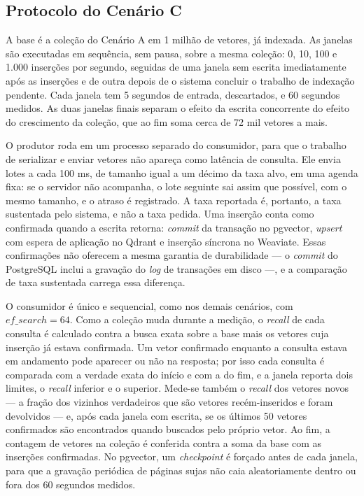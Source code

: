 \subsection{Protocolo do Cenário C}
\label{sec:protocolo_c}

A base é a coleção do Cenário A em 1 milhão de vetores, já indexada. As janelas são executadas em sequência, sem pausa, sobre a mesma coleção: 0, 10, 100 e 1.000 inserções por segundo, seguidas de uma janela sem escrita imediatamente após as inserções e de outra depois de o sistema concluir o trabalho de indexação pendente. Cada janela tem 5 segundos de entrada, descartados, e 60 segundos medidos. As duas janelas finais separam o efeito da escrita concorrente do efeito do crescimento da coleção, que ao fim soma cerca de 72 mil vetores a mais.

O produtor roda em um processo separado do consumidor, para que o trabalho de serializar e enviar vetores não apareça como latência de consulta. Ele envia lotes a cada 100 ms, de tamanho igual a um décimo da taxa alvo, em uma agenda fixa: se o servidor não acompanha, o lote seguinte sai assim que possível, com o mesmo tamanho, e o atraso é registrado. A taxa reportada é, portanto, a taxa sustentada pelo sistema, e não a taxa pedida. Uma inserção conta como confirmada quando a escrita retorna: \textit{commit} da transação no pgvector, \textit{upsert} com espera de aplicação no Qdrant e inserção síncrona no Weaviate. Essas confirmações não oferecem a mesma garantia de durabilidade --- o \textit{commit} do PostgreSQL inclui a gravação do \textit{log} de transações em disco ---, e a comparação de taxa sustentada carrega essa diferença.

O consumidor é único e sequencial, como nos demais cenários, com $ef\_search = 64$. Como a coleção muda durante a medição, o \textit{recall} de cada consulta é calculado contra a busca exata sobre a base mais os vetores cuja inserção já estava confirmada. Um vetor confirmado enquanto a consulta estava em andamento pode aparecer ou não na resposta; por isso cada consulta é comparada com a verdade exata do início e com a do fim, e a janela reporta dois limites, o \textit{recall} inferior e o superior. Mede-se também o \textit{recall} dos vetores novos --- a fração dos vizinhos verdadeiros que são vetores recém-inseridos e foram devolvidos --- e, após cada janela com escrita, se os últimos 50 vetores confirmados são encontrados quando buscados pelo próprio vetor. Ao fim, a contagem de vetores na coleção é conferida contra a soma da base com as inserções confirmadas. No pgvector, um \textit{checkpoint} é forçado antes de cada janela, para que a gravação periódica de páginas sujas não caia aleatoriamente dentro ou fora dos 60 segundos medidos.

